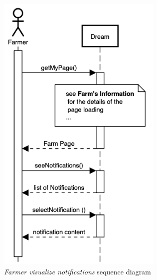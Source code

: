 \begin{enumerate}
    \begin{figure}[H]
        \begin{center}
        \includegraphics[width=0.7\textwidth]{sequence/SeeNotifications.png}
        \caption{\emph{Farmer visualize notifications} sequence diagram}
        \label{fig:sequence9}
        \end{center}
    \end{figure}


\end{enumerate}
